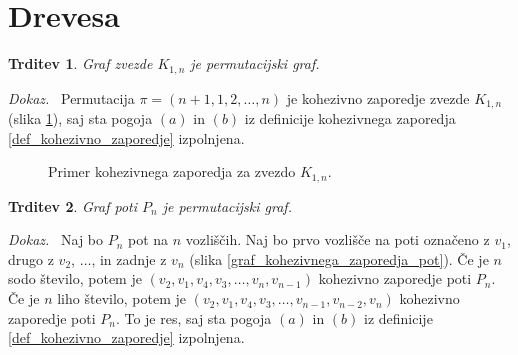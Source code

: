 \documentclass[a4paper, 12pt]{book}
\newtheorem{trditev}{Trditev}[chapter]
\newenvironment{dokaz}{\emph{Dokaz.}\ }{\hspace{\fill}{$\Box$}}
\begin{document}
\section{ Drevesa }

\begin{trditev}
\label{trditev_zvezde_permutacijski_graf}
    Graf zvezde $K_{1,n}$ je permutacijski graf.
\end{trditev}
\begin{dokaz}
    Permutacija $\pi = (n+1, 1, 2, \dots, n)$ je kohezivno zaporedje zvezde $K_{1, n}$ (slika \ref{graf_kohezivnega_zaporedja_zvezda}), saj sta pogoja $(a)$ in $(b)$ iz definicije kohezivnega zaporedja \ref{def_kohezivno_zaporedje} izpolnjena.
\end{dokaz}

\begin{figure}[h]
    \begin{center}        
    \end{center}
    \caption{Primer kohezivnega zaporedja za zvezdo $K_{1, n}$.}
    \label{graf_kohezivnega_zaporedja_zvezda}
\end{figure}

\begin{trditev}
\label{trditev_pot_permutacijski_graf}
    Graf poti $P_n$ je permutacijski graf.
\end{trditev}
\begin{dokaz}
    Naj bo $P_n$ pot na $n$ vozliščih. Naj bo prvo vozlišče na poti označeno z $v_1$, drugo z $v_2$, $\dots$, in zadnje z $v_n$ (slika \ref{graf_kohezivnega_zaporedja_pot}). Če je $n$ sodo število, potem je $(v_2, v_1, v_4, v_3,\dots,v_{n}, v_{n-1})$ kohezivno zaporedje poti $P_n$. Če je $n$ liho število, potem je $(v_2, v_1, v_4, v_3,\dots,v_{n-1}, v_{n-2}, v_{n})$ kohezivno zaporedje poti $P_n$. To je res, saj sta pogoja $(a)$ in $(b)$ iz definicije \ref{def_kohezivno_zaporedje} izpolnjena.
\end{dokaz}
\end{document}
